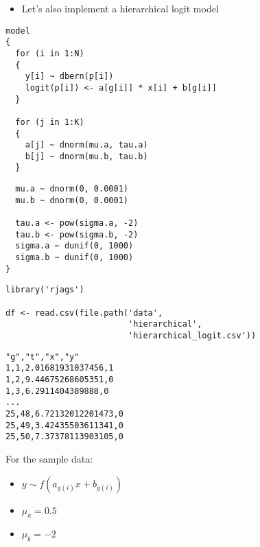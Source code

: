 \documentclass{beamer}
\begin{document}
\begin{frame}[fragile]
  \begin{itemize}
    \item{Let's also implement a hierarchical logit model}
  \end{itemize}
\end{frame}

\begin{frame}[fragile]
  \begin{verbatim}
model
{
  for (i in 1:N)
  {
    y[i] ~ dbern(p[i])
    logit(p[i]) <- a[g[i]] * x[i] + b[g[i]]
  }
  
  for (j in 1:K)
  {
    a[j] ~ dnorm(mu.a, tau.a)
    b[j] ~ dnorm(mu.b, tau.b)
  }
  \end{verbatim}
\end{frame}

\begin{frame}[fragile]
  \begin{verbatim}
  mu.a ~ dnorm(0, 0.0001)
  mu.b ~ dnorm(0, 0.0001)

  tau.a <- pow(sigma.a, -2)
  tau.b <- pow(sigma.b, -2)
  sigma.a ~ dunif(0, 1000)
  sigma.b ~ dunif(0, 1000)
}
  \end{verbatim}
\end{frame}

\begin{frame}[fragile]
  \begin{verbatim}
library('rjags')

df <- read.csv(file.path('data',
                         'hierarchical',
                         'hierarchical_logit.csv'))
  \end{verbatim}
\end{frame}

\begin{frame}[fragile]
  \begin{verbatim}
"g","t","x","y"
1,1,2.01681931037456,1
1,2,9.44675268605351,0
1,3,6.2911404389888,0
...
25,48,6.72132012201473,0
25,49,3.42435503611341,0
25,50,7.37378113903105,0
  \end{verbatim}
\end{frame}

\begin{frame}
  For the sample data:
  \begin{itemize}
    \item{$y \sim f(a_{g(i)} x + b_{g(i)})$}
    \item{$\mu_a = 0.5$}
    \item{$\mu_b = -2$}
  \end{itemize}
\end{frame}
\end{document}
